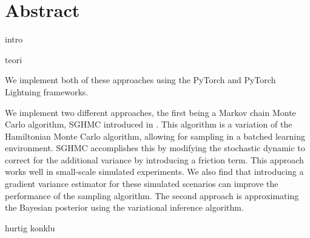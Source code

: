 \section*{Abstract}

intro

teori

We implement both of these approaches using the PyTorch and PyTorch Lightning frameworks.

We implement two different approaches, the first being a Markov chain Monte Carlo algorithm, SGHMC introduced in \autocite{chen_stochastic_2014}.
This algorithm is a variation of the Hamiltonian Monte Carlo algorithm, allowing for sampling in a batched learning environment.
SGHMC accomplishes this by modifying the stochastic dynamic to correct for the additional variance by introducing a friction term. 
This approach works well in small-scale simulated experiments. 
We also find that introducing a gradient variance estimator for these simulated scenarios can improve the performance of the sampling algorithm.
The second approach is approximating the Bayesian posterior using the variational inference algorithm.

hurtig konklu






